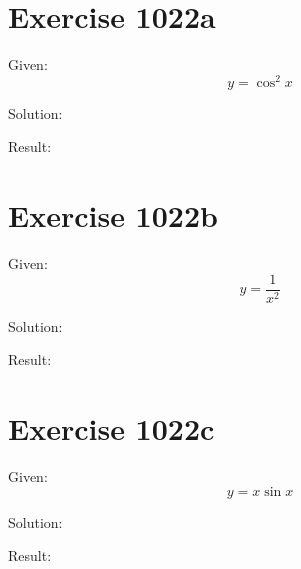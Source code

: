 \documentclass[a4paper, 10pt]{scrartcl}
\begin{document}
\section{Exercise 1022a}

Given:
\[
y = \cos^{2}{x}
\]

Solution:

Result:

\section{Exercise 1022b}

Given:
\[
y = \frac{1}{x^{2}}
\]

Solution:

Result:

\section{Exercise 1022c}

Given:
\[
y = x\sin{x}
\]

Solution:

Result:
\end{document}
